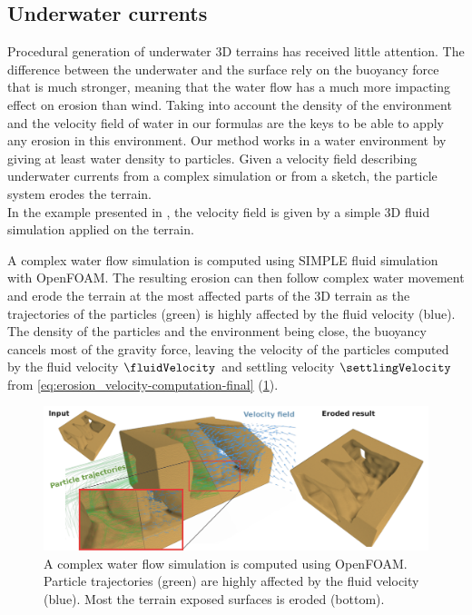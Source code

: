 \subsection{Underwater currents}
Procedural generation of underwater 3D terrains has received little attention. The difference between the underwater and the surface rely on the buoyancy force that is much stronger, meaning that the water flow has a much more impacting effect on erosion than wind. Taking into account the density of the environment and the velocity field of water in our formulas are the keys to be able to apply any erosion in this environment. 
Our method works in a water environment by giving at least water density to particles. Given a velocity field describing underwater currents from a complex simulation or from a sketch, the particle system erodes the terrain. \\ 
In the example presented in , the velocity field is given by a simple 3D fluid simulation \cite{Stam1999} applied on the terrain.

A complex water flow simulation is computed using SIMPLE \cite{Caretto1973} fluid simulation with OpenFOAM. The resulting erosion can then follow complex water movement and erode the terrain at the most affected parts of the 3D terrain as the trajectories of the particles (green) is highly affected by the fluid velocity (blue). The density of the particles and the environment being close, the buoyancy cancels most of the gravity force, leaving the velocity of the particles computed by the fluid velocity $\fluidVelocity$ and settling velocity $\settlingVelocity$ from \eqref{eq:erosion_velocity-computation-final} (\cref{fig:erosion_underwater_result}).
\begin{figure}[ht]
    \includegraphics{Results/flowfield.pdf}
    \caption{A complex water flow simulation is computed using OpenFOAM. Particle trajectories (green) are highly affected by the fluid velocity (blue). Most the terrain exposed surfaces is eroded (bottom). }
    \label{fig:erosion_underwater_result}
\end{figure}


